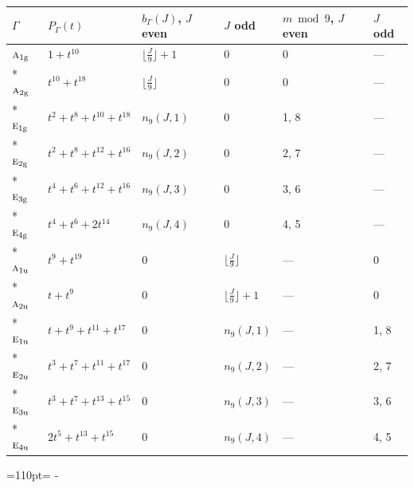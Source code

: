 \documentclass[10pt,a4paper]{article}
\newcommand{\needspace}[1]{\par\penalty-100\begingroup\dimen0=#1\relax\dimen2=\pagegoal
  \advance\dimen2-\pagetotal\ifdim\dimen0>\dimen2\relax\ifdim\dimen2>0pt\vfil\break\fi\fi
  \endgroup}
\numberwithin{equation}{section}
\newcommand{\irr}[1]{\text{\normalfont\scshape #1}}
\newcommand{\ptag}[1]{\mathrm{#1}}
\begin{document}
{\small{\renewcommand{\arraystretch}{1.3}\begin{longtable}{@{}llllll@{}}\toprule
$\Gamma$ & $P_\Gamma(t)$ & $b_\Gamma(J)$, $J$ even & $J$ odd & $m \bmod 9$, $J$ even & $J$ odd\\\midrule\endhead
\bottomrule\endfoot\endlastfoot
$\irr{a}_{1\ptag{g}}$ & $1 + t^{10}$ & $\bigl\lfloor\tfrac{J}{9}\bigr\rfloor + 1$ & $0$ & 0 & ---\\*
$\irr{a}_{2\ptag{g}}$ & $t^{10} + t^{18}$ & $\bigl\lfloor\tfrac{J}{9}\bigr\rfloor$ & $0$ & 0 & ---\\*
$\irr{e}_{1\ptag{g}}$ & $t^{2} + t^{8} + t^{10} + t^{18}$ & $n_{9}(J,1)$ & $0$ & 1, 8 & ---\\*
$\irr{e}_{2\ptag{g}}$ & $t^{2} + t^{8} + t^{12} + t^{16}$ & $n_{9}(J,2)$ & $0$ & 2, 7 & ---\\*
$\irr{e}_{3\ptag{g}}$ & $t^{4} + t^{6} + t^{12} + t^{16}$ & $n_{9}(J,3)$ & $0$ & 3, 6 & ---\\*
$\irr{e}_{4\ptag{g}}$ & $t^{4} + t^{6} + 2t^{14}$ & $n_{9}(J,4)$ & $0$ & 4, 5 & ---\\*
$\irr{a}_{1\ptag{u}}$ & $t^{9} + t^{19}$ & $0$ & $\bigl\lfloor\tfrac{J}{9}\bigr\rfloor$ & --- & 0\\*
$\irr{a}_{2\ptag{u}}$ & $t + t^{9}$ & $0$ & $\bigl\lfloor\tfrac{J}{9}\bigr\rfloor + 1$ & --- & 0\\*
$\irr{e}_{1\ptag{u}}$ & $t + t^{9} + t^{11} + t^{17}$ & $0$ & $n_{9}(J,1)$ & --- & 1, 8\\*
$\irr{e}_{2\ptag{u}}$ & $t^{3} + t^{7} + t^{11} + t^{17}$ & $0$ & $n_{9}(J,2)$ & --- & 2, 7\\*
$\irr{e}_{3\ptag{u}}$ & $t^{3} + t^{7} + t^{13} + t^{15}$ & $0$ & $n_{9}(J,3)$ & --- & 3, 6\\*
$\irr{e}_{4\ptag{u}}$ & $2t^{5} + t^{13} + t^{15}$ & $0$ & $n_{9}(J,4)$ & --- & 4, 5\\
\bottomrule\end{longtable}}}
\needspace{110pt}
\end{document}
